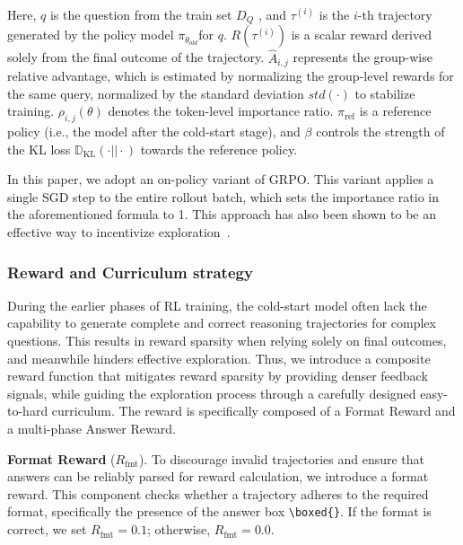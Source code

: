 Here, $q$ is the question from the train set $D_Q$ , and $\tau^{(i)}$ is the $i$-th trajectory generated by the policy model $\pi_{\theta_{old}} $for $q$. $R(\tau^{(i)})$ is a scalar reward derived solely from the final outcome of the trajectory. $\hat{A}_{i,j}$ represents the group-wise relative advantage, which is estimated by normalizing the group-level rewards for the same query, normalized by the standard deviation $std(\cdot)$ to stabilize training. $\rho_{i,j}(\theta)$ denotes the token-level importance ratio. $\pi_{\text{ref}}$ is a reference policy (i.e., the model after the cold-start stage), and $\beta$ controls the strength of the KL loss $\mathbb{D}_{\mathrm{KL}}(\cdot || \cdot)$ towards the reference policy.

In this paper, we adopt an on-policy variant of GRPO. This variant applies a single SGD step to the entire rollout batch, which sets the importance ratio in the aforementioned formula to 1. This approach has also been shown to be an effective way to incentivize exploration~\citep{he2025skywork}. 

\subsubsection{Reward and Curriculum strategy}
During the earlier phases of RL training, the cold-start model often lack the capability to generate complete and correct reasoning trajectories for complex questions. This results in reward sparsity when relying solely on final outcomes, and meanwhile hinders effective exploration. Thus, we introduce a composite reward function that mitigates reward sparsity by providing denser feedback signals, while guiding the exploration process through a carefully designed easy-to-hard curriculum. The reward is specifically composed of a Format Reward and a multi-phase Answer Reward.

\textbf{Format Reward} ($R_{\text{fmt}}$). To discourage invalid trajectories and ensure that answers can be reliably parsed for reward calculation, we introduce a format reward. This component checks whether a trajectory adheres to the required format, specifically the presence of the answer box \verb|\boxed{}|. If the format is correct, we set $R_{\text{fmt}}=0.1$; otherwise, $R_{\text{fmt}}=0.0$. 

